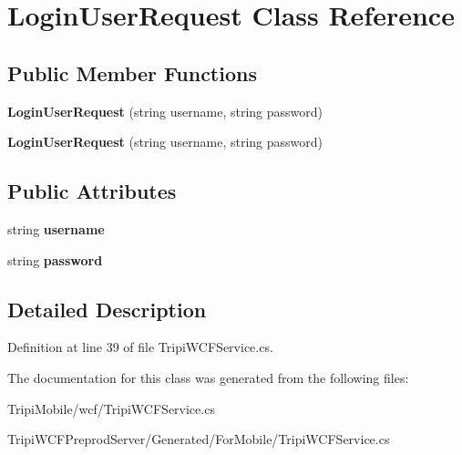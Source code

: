 \hypertarget{class_login_user_request}{
\section{LoginUserRequest Class Reference}
\label{class_login_user_request}
}
\subsection*{Public Member Functions}
\begin{DoxyCompactItemize}
\item 
\hypertarget{class_login_user_request_a6de0dd38f24a0ecdb1d1f92899dd5bac}{
{\bfseries LoginUserRequest} (string username, string password)}
\label{class_login_user_request_a6de0dd38f24a0ecdb1d1f92899dd5bac}

\item 
\hypertarget{class_login_user_request_a6de0dd38f24a0ecdb1d1f92899dd5bac}{
{\bfseries LoginUserRequest} (string username, string password)}
\label{class_login_user_request_a6de0dd38f24a0ecdb1d1f92899dd5bac}

\end{DoxyCompactItemize}
\subsection*{Public Attributes}
\begin{DoxyCompactItemize}
\item 
\hypertarget{class_login_user_request_a403c7d4a5e84d93c50307da16a28770e}{
string {\bfseries username}}
\label{class_login_user_request_a403c7d4a5e84d93c50307da16a28770e}

\item 
\hypertarget{class_login_user_request_ac6680d41055d9c4cc55ff1b9d8cbf7fa}{
string {\bfseries password}}
\label{class_login_user_request_ac6680d41055d9c4cc55ff1b9d8cbf7fa}

\end{DoxyCompactItemize}


\subsection{Detailed Description}


Definition at line 39 of file TripiWCFService.cs.

The documentation for this class was generated from the following files:\begin{DoxyCompactItemize}
\item 
TripiMobile/wcf/TripiWCFService.cs\item 
TripiWCFPreprodServer/Generated/ForMobile/TripiWCFService.cs\end{DoxyCompactItemize}
